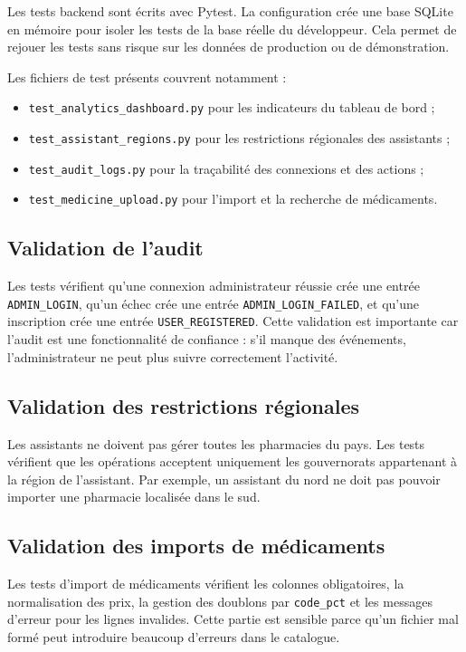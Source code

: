 Les tests backend sont écrits avec Pytest. La configuration crée une base SQLite en mémoire pour isoler
les tests de la base réelle du développeur. Cela permet de rejouer les tests sans risque sur les données de
production ou de démonstration.

Les fichiers de test présents couvrent notamment :

\begin{itemize}
    \item \texttt{test\_analytics\_dashboard.py} pour les indicateurs du tableau de bord ;
    \item \texttt{test\_assistant\_regions.py} pour les restrictions régionales des assistants ;
    \item \texttt{test\_audit\_logs.py} pour la traçabilité des connexions et des actions ;
    \item \texttt{test\_medicine\_upload.py} pour l'import et la recherche de médicaments.
\end{itemize}

\subsection{Validation de l'audit}

Les tests vérifient qu'une connexion administrateur réussie crée une entrée
\texttt{ADMIN\_LOGIN}, qu'un échec crée une entrée \texttt{ADMIN\_LOGIN\_FAILED}, et qu'une inscription crée
une entrée \texttt{USER\_REGISTERED}. Cette validation est importante car l'audit est une fonctionnalité de
confiance : s'il manque des événements, l'administrateur ne peut plus suivre correctement l'activité.

\subsection{Validation des restrictions régionales}

Les assistants ne doivent pas gérer toutes les pharmacies du pays. Les tests vérifient que les opérations
acceptent uniquement les gouvernorats appartenant à la région de l'assistant. Par exemple, un assistant
du nord ne doit pas pouvoir importer une pharmacie localisée dans le sud.

\subsection{Validation des imports de médicaments}

Les tests d'import de médicaments vérifient les colonnes obligatoires, la normalisation des prix, la gestion
des doublons par \texttt{code\_pct} et les messages d'erreur pour les lignes invalides. Cette partie est
sensible parce qu'un fichier mal formé peut introduire beaucoup d'erreurs dans le catalogue.

